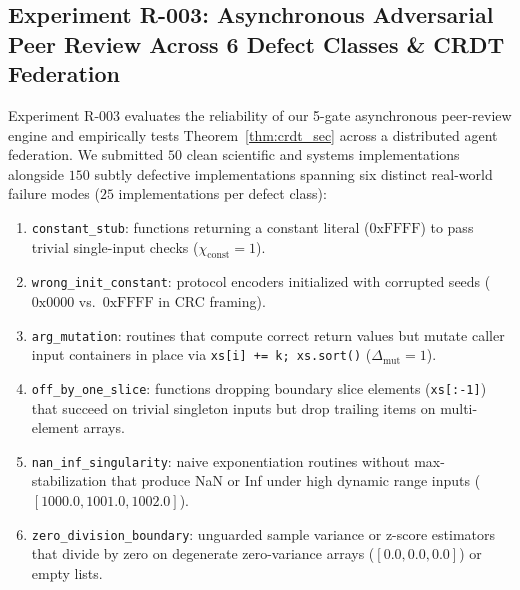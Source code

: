 \documentclass[10pt,twocolumn]{article}
\begin{document}
\subsection{Experiment R-003: Asynchronous Adversarial Peer Review Across 6 Defect Classes \& CRDT Federation}
\label{sec:exp_r003}

\begin{table}[t]
\centering
\caption{\textbf{Pre-registered hypothesis outcomes for Experiment R-003: Asynchronous Peer Review Quarantine Across 6 Defect Classes \& Distributed CRDT Convergence.} Auto-generated by \texttt{ResearchHarness} (Artifact SHA-256: \texttt{9f71a5e11e05}).}
\label{tab:r003_results}
\footnotesize

\end{table}

Experiment R-003 evaluates the reliability of our 5-gate asynchronous peer-review engine and empirically tests Theorem~\ref{thm:crdt_sec} across a distributed agent federation. We submitted $50$ clean scientific and systems implementations alongside $150$ subtly defective implementations spanning six distinct real-world failure modes ($25$ implementations per defect class):
\begin{enumerate}
    \item \texttt{constant\_stub}: functions returning a constant literal ($0\text{xFFFF}$) to pass trivial single-input checks ($\chi_{\text{const}} = 1$).
    \item \texttt{wrong\_init\_constant}: protocol encoders initialized with corrupted seeds ($0\text{x}0000$ vs.\ $0\text{xFFFF}$ in CRC framing).
    \item \texttt{arg\_mutation}: routines that compute correct return values but mutate caller input containers in place via \texttt{xs[i] += k; xs.sort()} ($\Delta_{\text{mut}} = 1$).
    \item \texttt{off\_by\_one\_slice}: functions dropping boundary slice elements (\texttt{xs[:-1]}) that succeed on trivial singleton inputs but drop trailing items on multi-element arrays.
    \item \texttt{nan\_inf\_singularity}: naive exponentiation routines without max-stabilization that produce NaN or Inf under high dynamic range inputs ($[1000.0, 1001.0, 1002.0]$).
    \item \texttt{zero\_division\_boundary}: unguarded sample variance or z-score estimators that divide by zero on degenerate zero-variance arrays ($[0.0, 0.0, 0.0]$) or empty lists.
\end{enumerate}
\end{document}

